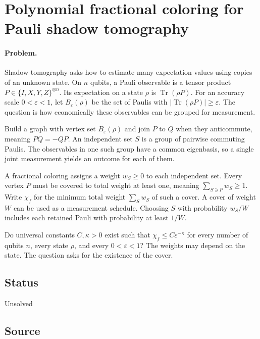 \section{Polynomial fractional coloring for Pauli shadow tomography}
\label{sec:op_161b5f34e4751e33}

\paragraph{Problem.}
Shadow tomography asks how to estimate many expectation values using copies of an unknown state. On $n$ qubits, a Pauli observable is a tensor product $P\in\{I,X,Y,Z\}^{\otimes n}$. Its expectation on a state $\rho$ is $\operatorname{Tr}(\rho P)$. For an accuracy scale $0<\varepsilon<1$, let $B_\varepsilon(\rho)$ be the set of Paulis with $\lvert\operatorname{Tr}(\rho P)\rvert\geq\varepsilon$. The question is how economically these observables can be grouped for measurement.

Build a graph with vertex set $B_\varepsilon(\rho)$ and join $P$ to $Q$ when they anticommute, meaning $PQ=-QP$. An independent set $S$ is a group of pairwise commuting Paulis. The observables in one such group have a common eigenbasis, so a single joint measurement yields an outcome for each of them.

A fractional coloring assigns a weight $w_S\geq0$ to each independent set. Every vertex $P$ must be covered to total weight at least one, meaning $\sum_{S\ni P}w_S\geq1$. Write $\chi_f$ for the minimum total weight $\sum_S w_S$ of such a cover. A cover of weight $W$ can be used as a measurement schedule. Choosing $S$ with probability $w_S/W$ includes each retained Pauli with probability at least $1/W$.

Do universal constants $C,\kappa>0$ exist such that $\chi_f\leq C\varepsilon^{-\kappa}$ for every number of qubits $n$, every state $\rho$, and every $0<\varepsilon<1$? The weights may depend on the state. The question asks for the existence of the cover.

\subsection*{Status}

Unsolved

\subsection*{Source}

